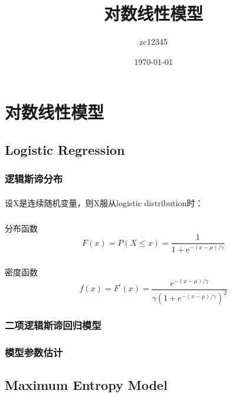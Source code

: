 \documentclass[UTF8]{ctexart}
\begin{document}
\title{对数线性模型}
\author{zc12345}
\date\today
\maketitle
\tableofcontents
\else
\section{对数线性模型}
\fi
\subsection{Logistic Regression}
\subsubsection{逻辑斯谛分布}
\paragraph{}
设X是连续随机变量，则X服从logistic distribution时：
\subparagraph{}
分布函数
\begin{equation}
F(x)=P(X \leq x)=\frac{1}{1+\mathrm{e}^{-(x-\mu) / \gamma}}
\end{equation}
\subparagraph{}
密度函数
\begin{equation}
f(x)=F^{\prime}(x)=\frac{e^{-(x-\mu) / \gamma}}{\gamma\left(1+e^{-(x-\mu) / \gamma}\right)^{2}}
\end{equation}
\subsubsection{二项逻辑斯谛回归模型}
\subsubsection{模型参数估计}
\subsection{Maximum Entropy Model}
\ifx\allfiles\undefined
\end{document}
